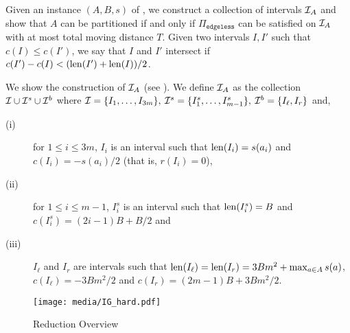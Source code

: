 Given an instance $(A,B,s)$ of {\threepartition}, we construct a collection of intervals $\mathcal{I}_A$ and show that $A$ can be partitioned if and only if $\Pi_{\texttt{edgeless}}$ can be satisfied on $\mathcal{I}_A$ with at most total moving distance $T$.
Given two intervals $I,I'$ such that $c(I)\le c(I')$, we say that $I$ and $I'$ intersect if $c(I')-c(I) < (\mathrm{len}(I')+\mathrm{len}(I))/2$.

We show the construction of $\mathcal{I}_A$ (see ).
We define $\mathcal{I}_A$ as the collection $\mathcal{I}\cup \mathcal{I}^s \cup \mathcal{I}^b$ where $\mathcal{I} = \{I_1,\ldots,I_{3m}\},\: \mathcal{I}^s = \{I^s_1,\ldots,I^s_{m-1}\},\: \mathcal{I}^b =  \{I_\ell,I_r\}$ and,
\begin{description}%
    \item[(i)] for $1\le i\le 3m$, $I_i$ is an interval such that $\mathrm{len}(I_i) = s(a_i)$ and $c(I_i) = -s(a_i)/2$ (that is, $r(I_i) = 0$),
    \item[(ii)] for $1\le i \le m-1$, $I^s_i$ is an interval such that $\mathrm{len}(I^s_i) = B$ and $c(I^s_i) = (2i-1)B + B/2$ and
    \item[(iii)] $I_\ell$ and $I_r$ are intervals such that $\mathrm{len}(I_\ell) = \mathrm{len}(I_r) = 3Bm^2 + \max_{a\in A}{s(a)}$, $c(I_\ell) = -3Bm^2/2$ and $c(I_r) = (2m-1)B+3Bm^2/2$.
\end{description}
    
    \begin{figure}[!b]
        \centering
        \texttt{[image: media/IG\_hard.pdf]}
        \caption{Reduction Overview}
        \label{fig:reduction_overview_ig_hard}
    \end{figure}  
    
